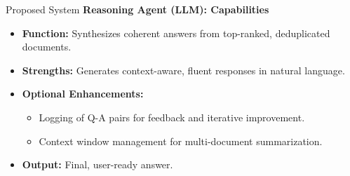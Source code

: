 \begin{frame}{Proposed System}
\textbf{Reasoning Agent (\textbf{LLM}): Capabilities}

\begin{itemize}
    \item \textbf{Function:} Synthesizes coherent answers from top-ranked, deduplicated documents.
    \item \textbf{Strengths:} Generates context-aware, fluent responses in natural language.
    \item \textbf{Optional Enhancements:}
        \begin{itemize}
            \item Logging of Q-A pairs for feedback and iterative improvement.
            \item Context window management for multi-document summarization.
        \end{itemize}
    \item \textbf{Output:} Final, user-ready answer.
\end{itemize}
\end{frame}
